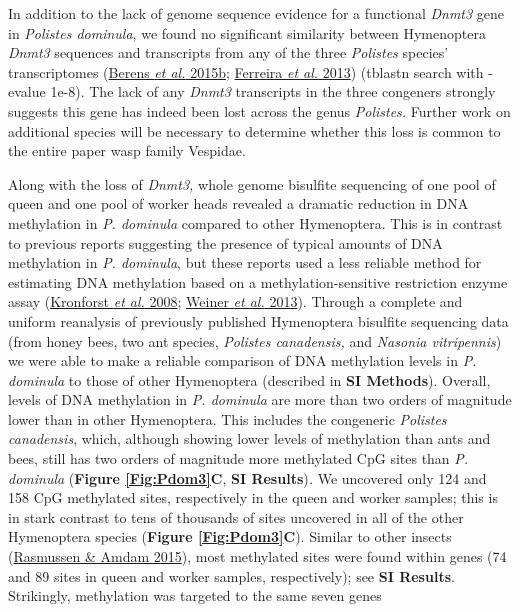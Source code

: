 In addition to the lack of genome sequence evidence for a functional
\textit{Dnmt3} gene in \textit{Polistes dominula}, we found no significant
similarity between Hymenoptera \textit{Dnmt3} sequences and transcripts
from any of the three \textit{Polistes} species' transcriptomes
(\protect\hyperlink{ux5fENREFux5f3}{Berens \textit{et al.} 2015b};
\protect\hyperlink{ux5fENREFux5f10}{Ferreira \textit{et al.} 2013})
(tblastn search with -evalue 1e-8). The lack of any \textit{Dnmt3}
transcripts in the three congeners strongly suggests this gene has
indeed been lost across the genus \textit{Polistes.} Further work on
additional species will be necessary to determine whether this loss is
common to the entire paper wasp family Vespidae.

Along with the loss of \textit{Dnmt3,} whole genome bisulfite sequencing
of one pool of queen and one pool of worker heads revealed a dramatic
reduction in DNA methylation in \textit{P. dominula} compared to other
Hymenoptera. This is in contrast to previous reports suggesting the
presence of typical amounts of DNA methylation in \textit{P. dominula},
but these reports used a less reliable method for estimating DNA
methylation based on a methylation-sensitive restriction enzyme assay
(\protect\hyperlink{ux5fENREFux5f26}{Kronforst \textit{et al.} 2008};
\protect\hyperlink{ux5fENREFux5f67}{Weiner \textit{et al.} 2013}). Through
a complete and uniform reanalysis of previously published Hymenoptera
bisulfite sequencing data (from honey bees, two ant species,
\textit{Polistes canadensis,} and \textit{Nasonia vitripennis}) we were able
to make a reliable comparison of DNA methylation levels in \textit{P.
dominula} to those of other Hymenoptera (described in \textbf{SI
Methods}). Overall, levels of DNA methylation in \textit{P. dominula} are
more than two orders of magnitude lower than in other Hymenoptera. This
includes the congeneric \textit{Polistes canadensis}, which, although
showing lower levels of methylation than ants and bees, still has two
orders of magnitude more methylated CpG sites than \textit{P. dominula}
(\textbf{Figure \ref{Fig:Pdom3}C}, \textbf{SI Results})\textit{.} We uncovered only 124
and 158 CpG methylated sites, respectively in the queen and worker
samples; this is in stark contrast to tens of thousands of sites
uncovered in all of the other Hymenoptera species (\textbf{Figure \ref{Fig:Pdom3}C}).
Similar to other insects (\protect\hyperlink{ux5fENREFux5f45}{Rasmussen
\& Amdam 2015}), most methylated sites were found within genes (74 and
89 sites in queen and worker samples, respectively); see \textbf{SI
Results}. Strikingly, methylation was targeted to the same seven genes
